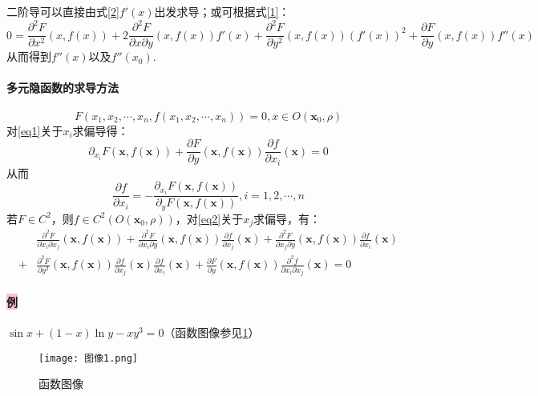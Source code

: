 \documentclass[UTF8]{ctexart}
\begin{document}
    二阶导可以直接由式\eqref{2}$f'(x)$出发求导；或可根据式\eqref{1}：
    $$0=\frac{\partial^2 F}{\partial x^2}(x,f(x))+2\frac{\partial^2F}{\partial x\partial y}(x,f(x))f'(x)+\frac{\partial^2F}{\partial y^2}(x,f(x))(f'(x))^2+\frac{\partial F}{\partial y}(x,f(x))f''(x)$$
    从而得到$f''(x)$以及$f''(x_0)$.


    \paragraph{\colorbox{cyan!70}{多元隐函数的求导方法}}
        \begin{equation}
            F(x_1,x_2,\cdots,x_n,f(x_1,x_2,\cdots,x_n))=0,x\in O(\boldsymbol{x}_0,\rho) \label{eq1}
        \end{equation}
        对\eqref{eq1}关于$x_i$求偏导得：
        \begin{equation}
            \partial_{x_i}F(\boldsymbol{x},f(\boldsymbol{x}))+\frac{\partial F}{\partial y}(\boldsymbol{x},f(\boldsymbol{x}))\frac{\partial f}{\partial x_i}(\boldsymbol{x})=0 \label{eq2}
        \end{equation}
        从而
        \begin{equation}
            \frac{\partial f}{\partial x_i}=-\frac{\partial_{x_i}F(\boldsymbol{x},f(\boldsymbol{x}))}{\partial_yF(\boldsymbol{x},f(\boldsymbol{x}))},i=1,2,\cdots,n \label{eq3}
        \end{equation}
        若$F\in C^2$，则$f\in C^2( O(\boldsymbol{x}_0,\rho))$，对\eqref{eq2}关于$x_j$求偏导，有：
        \begin{align}
            &\frac{\partial^2F}{\partial x_i\partial x_j}(\boldsymbol{x},f(\boldsymbol{x}))+\frac{\partial^2F}{\partial x_i\partial y}(\boldsymbol{x},f(\boldsymbol{x}))\frac{\partial f}{\partial x_j}(\boldsymbol{x})+\frac{\partial^2F}{\partial x_j\partial y}(\boldsymbol{x},f(\boldsymbol{x}))\frac{\partial f}{\partial x_i}(\boldsymbol{x})\\
            +&\frac{\partial^2F}{\partial y^2}(\boldsymbol{x},f(\boldsymbol{x}))\frac{\partial f}{\partial x_j}(\boldsymbol{x})\frac{\partial f}{\partial x_i}(\boldsymbol{x})+\frac{\partial F}{\partial y}(\boldsymbol{x},f(\boldsymbol{x}))\frac{\partial^2f}{\partial x_i\partial x_j}(\boldsymbol{x})=0
        \end{align}

        \paragraph{\colorbox{pink}{例}}$\sin x+(1-x)\ln y-xy^3=0$（函数图像参见\ref{图像}）
        \begin{figure}[h]
            \centering
            \texttt{[image: 图像1.png]}
            \caption{函数图像}
            \label{图像}
        \end{figure}
\end{document}
